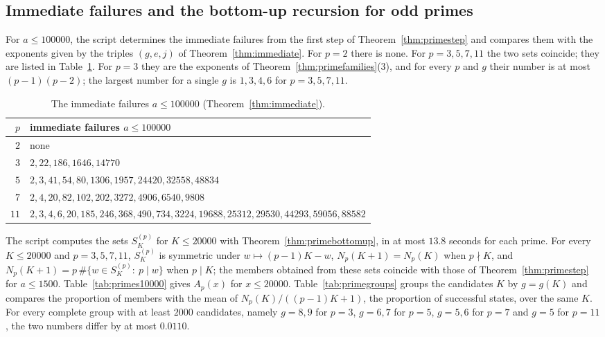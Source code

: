 \documentclass[11pt]{amsart}
\theoremstyle{definition}
\begin{document}
\subsection{Immediate failures and the bottom-up recursion for odd primes}
\label{subsec:primes2-exp}
For $a\le100000$, the script determines the immediate failures from the first step of Theorem~\ref{thm:primestep} and compares them with the exponents given by the triples $(g,e,j)$ of Theorem~\ref{thm:immediate}. For $p=2$ there is none. For $p=3,5,7,11$ the two sets coincide; they are listed in Table~\ref{tab:immediate}. For $p=3$ they are the exponents of Theorem~\ref{thm:primefamilies}(3), and for every $p$ and $g$ their number is at most $(p-1)(p-2)$; the largest number for a single $g$ is $1,3,4,6$ for $p=3,5,7,11$.

\begin{table}[H]
\centering
\caption{The immediate failures $a\le100000$ (Theorem~\ref{thm:immediate}).}
\label{tab:immediate}
\begin{tabular}{rl}
\toprule
$p$ & immediate failures $a\le100000$\\
\midrule
$2$ & none\\
$3$ & $2,22,186,1646,14770$\\
$5$ & $2,3,41,54,80,1306,1957,24420,32558,48834$\\
$7$ & $2,4,20,82,102,202,3272,4906,6540,9808$\\
$11$ & $2,3,4,6,20,185,246,368,490,734,3224,19688,25312,29530,44293,59056,88582$\\
\bottomrule
\end{tabular}
\end{table}

The script computes the sets $S^{(p)}_K$ for $K\le20000$ with Theorem~\ref{thm:primebottomup}, in at most $13.8$ seconds for each prime. For every $K\le20000$ and $p=3,5,7,11$, $S^{(p)}_K$ is symmetric under $w\mapsto(p-1)K-w$, $N_p(K+1)=N_p(K)$ when $p\nmid K$, and $N_p(K+1)=p\,\#\{w\in S^{(p)}_K:\ p\mid w\}$ when $p\mid K$; the members obtained from these sets coincide with those of Theorem~\ref{thm:primestep} for $a\le1500$. Table~\ref{tab:primes10000} gives $A_p(x)$ for $x\le20000$. Table~\ref{tab:primegroups} groups the candidates $K$ by $g=g(K)$ and compares the proportion of members with the mean of $N_p(K)/((p-1)K+1)$, the proportion of successful states, over the same $K$. For every complete group with at least $2000$ candidates, namely $g=8,9$ for $p=3$, $g=6,7$ for $p=5$, $g=5,6$ for $p=7$ and $g=5$ for $p=11$, the two numbers differ by at most $0.0110$.
\end{document}
